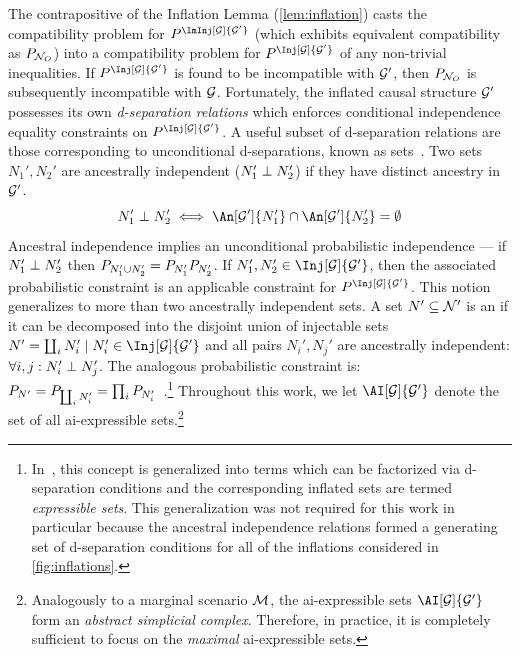\documentclass[aps, 10pt, english, twoside, pra, nofootinbib, tightenlines, longbibliography, superscriptaddress]{revtex4-1}
\begin{document}
    The contrapositive of the Inflation Lemma (\cref{lem:inflation}) casts the compatibility problem for $\prob^{\ImInj[\graph]{\graph'}}$ (which exhibits equivalent compatibility as $\prob[\nodes_O]$) into a compatibility problem for $\prob^{\Inj[\graph]{\graph'}}$ of any non-trivial inequalities. If $\prob^{\Inj[\graph]{\graph'}}$ is found to be incompatible with $\mathcal{G}'$, then $\prob[\nodes_O]$ is subsequently incompatible with $\mathcal{G}$. Fortunately, the inflated causal structure $\mathcal{G}'$ possesses its own \textit{d-separation relations} which enforces conditional independence equality constraints on $\prob^{\Inj[\graph]{\graph'}}$. A useful subset of d-separation relations are those corresponding to unconditional d-separations, known as  sets~\cite{Pearl_2009}. Two sets $N_1', N_2'$ are ancestrally independent ($N_1' \perp N_2'$) if they have distinct ancestry in $\mathcal{G}'$.
    \[ N_1' \ancestralindep N_2' \iff \An[\graph']{N_1'} \cap \An[\graph']{N_2'}= \emptyset \]
    Ancestral independence implies an unconditional probabilistic independence --- if $N_1' \perp N_2'$ then $\prob[N_1' \cup N_2'] = \prob[N_1']\prob[N_2']$. If $N_1', N_2' \in \Inj[\graph]{\graph'}$, then the associated probabilistic constraint is an applicable constraint for $\prob^{\Inj[\graph]{\graph'}}$. This notion generalizes to more than two ancestrally independent sets. A set $N' \subseteq \mathcal{N}'$ is an  if it can be decomposed into the disjoint union of injectable sets $N' = \coprod_{i} N'_i \mid N'_i \in \Inj[\graph]{\graph'}$ and all pairs $N_i', N_j'$ are ancestrally independent: $\forall i, j : N_i' \perp N_j'$. The analogous probabilistic constraint is: $\prob[N'] = \prob[\coprod_i N'_i] = \prod_{i}\prob[N'_i]$~\cite{Pearl_2009}.\footnote{In~\cite{Inflation}, this concept is generalized into terms which can be factorized via d-separation conditions and the corresponding inflated sets are termed \textit{expressible sets}. This generalization was not required for this work in particular because the ancestral independence relations formed a generating set of d-separation conditions for all of the inflations considered in \cref{fig:inflations}.} Throughout this work, we let $\AI[\graph]{\graph'}$ denote the set of all ai-expressible sets.\footnote{Analogously to a marginal scenario $\mathcal{M}$, the ai-expressible sets $\AI[\graph]{\graph'}$ form an \textit{abstract simplicial complex}. Therefore, in practice, it is completely sufficient to focus on the \textit{maximal} ai-expressible sets.}
\end{document}
